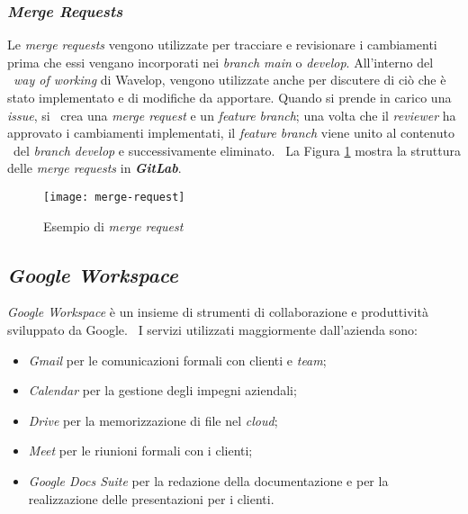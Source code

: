 \newpage
\subsubsection{\emph{Merge Requests}}
Le \emph{merge requests} vengono utilizzate per tracciare e revisionare i cambiamenti prima che essi vengano incorporati nei \emph{branch main} o \emph{develop}. All'interno del \
\emph{way of working} di Wavelop, vengono utilizzate anche per discutere di ciò che è stato implementato e di modifiche da apportare. Quando si prende in carico una \emph{issue}, si \
crea una \emph{merge request} e un \emph{feature branch}; una volta che il \emph{reviewer} ha approvato i cambiamenti implementati, il \emph{feature branch} viene unito al contenuto \
del \emph{branch develop} e successivamente eliminato. \
La Figura \ref{fig:mr} mostra la struttura delle \emph{merge requests} in \textbf{\emph{GitLab}}.

\begin{figure}[!ht]
  \begin{center}
    \texttt{[image: merge-request]}
    \caption{Esempio di \emph{merge request}}
    \label{fig:mr}
  \end{center}
\end{figure}

\newpage
\subsection{\emph{Google Workspace}}
\emph{Google Workspace} è un insieme di strumenti di collaborazione e produttività sviluppato da Google. \
I servizi utilizzati maggiormente dall'azienda sono:

\begin{itemize}
  \item \emph{Gmail} per le comunicazioni formali con clienti e \emph{team};
  \item \emph{Calendar} per la gestione degli impegni aziendali;
  \item \emph{Drive} per la memorizzazione di file nel \emph{cloud};
  \item \emph{Meet} per le riunioni formali con i clienti;
  \item \emph{Google Docs Suite} per la redazione della documentazione e per la realizzazione delle presentazioni per i clienti.
\end{itemize}

